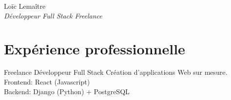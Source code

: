 \documentclass[10pt]{article} %
\begin{document}
\begin{paracol}{2} %


  \parbox[top][0.12\textheight][c]{\linewidth}{ %
    \vspace{-0.04\textheight} %
    \centering %
    {\sffamily\Huge Loïc Lemaître}\\\medskip %
    {\Large\color{headings}\textit{Développeur Full Stack Freelance}}
  }


  \section{Expérience professionnelle}





  {} %
  {Freelance} %
  {Développeur Full Stack} %
  {Création d'applications Web sur mesure.\\
    Frontend: React (Javascript)\\
    Backend: Django (Python) + PostgreSQL}  %



\end{paracol}
\end{document}
